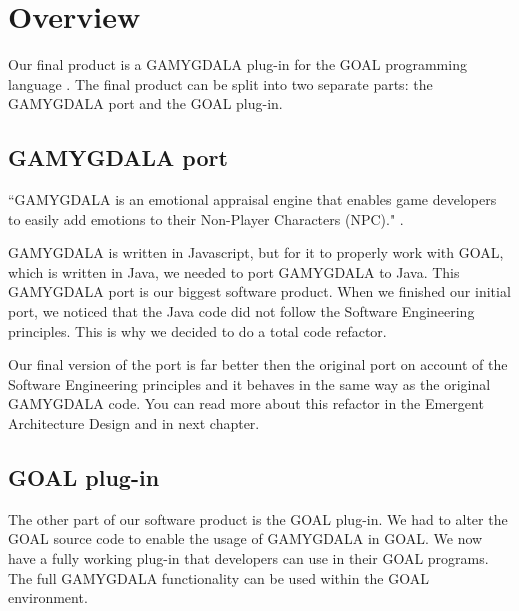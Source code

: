 \section{Overview}
Our final product is a GAMYGDALA \citep{gamygdala} plug-in for the GOAL programming language \citep{goal}. The final product can be split into two separate parts: the GAMYGDALA port and the GOAL plug-in.

\subsection{GAMYGDALA port}
``GAMYGDALA is an emotional appraisal engine that enables game developers to easily add emotions to their Non-Player Characters (NPC)." \citep{gamygdala}. \par
GAMYGDALA is written in Javascript, but for it to properly work with GOAL, which is written in Java, we needed to port GAMYGDALA to Java. This GAMYGDALA port is our biggest software product. When we finished our initial port, we noticed that the Java code did not follow the Software Engineering principles. This is why we decided to do a total code refactor. \par 
Our final version of the port is far better then the original port on account of the Software Engineering principles and it behaves in the same way as the original GAMYGDALA code. You can read more about this refactor in the Emergent Architecture Design \citep{ead} and in next chapter.

\subsection{GOAL plug-in}
The other part of our software product is the GOAL plug-in. We had to alter the GOAL source code to enable the usage of GAMYGDALA in GOAL. We now have a fully working plug-in that developers can use in their GOAL programs. The full GAMYGDALA functionality can be used within the GOAL environment.